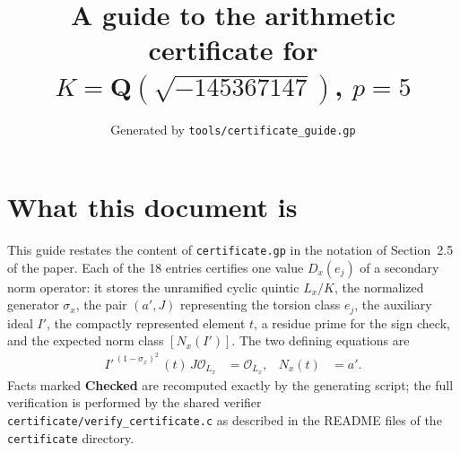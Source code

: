 \documentclass[11pt]{article}
\title{A guide to the arithmetic certificate for $K=\mathbf Q(\sqrt{-145367147})$, $p=5$}
\author{}
\date{Generated by \texttt{tools/certificate\_guide.gp}}
\begin{document}
\maketitle
\section*{What this document is}
This guide restates the content of \texttt{certificate.gp} in the
notation of Section~2.5 of the paper.  Each of the 18 entries
certifies one value $D_x(e_j)$ of a secondary norm operator: it
stores the unramified cyclic quintic $L_x/K$, the normalized
generator $\sigma_x$, the pair $(a',J)$ representing the torsion
class $e_j$, the auxiliary ideal $I'$, the compactly represented
element $t$, a residue prime for the sign check, and the expected
norm class $[N_x(I')]$.  The two defining equations are
\begin{align*}
I'^{\,(1-\sigma_x)^2}\,(t)\,J\mathcal O_{L_x}&=\mathcal O_{L_x},&
N_x(t)&=a'.
\end{align*}
Facts marked \textbf{Checked} are recomputed exactly by the
generating script; the full verification is performed by the
shared verifier \texttt{certificate/verify\_certificate.c} as
described in the README files of the \texttt{certificate}
directory.
\end{document}
